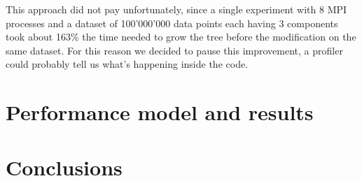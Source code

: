 \documentclass{article}
\begin{document}
This approach did not pay unfortunately, since a single experiment with 8 MPI
processes and a dataset of 100'000'000 data points each having 3 components
took about 163\% the time needed to grow the tree before the modification on the
same dataset. For this reason we decided to pause this improvement, a profiler
could probably tell us what's happening inside the code.

\section{Performance model and results}

\section{Conclusions}


\end{document}
